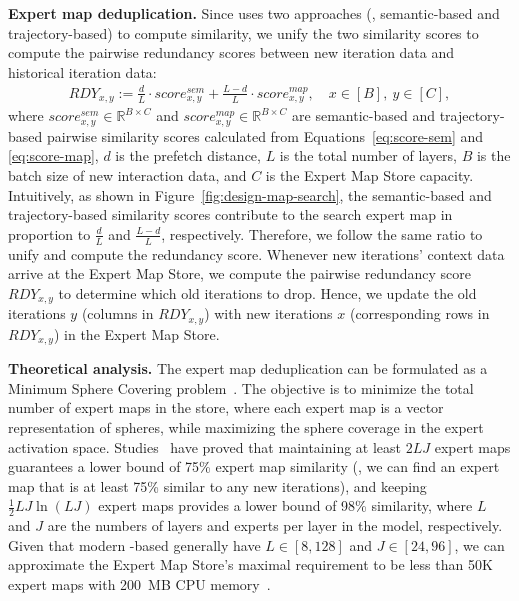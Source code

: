 \textbf{Expert map deduplication.}
Since \sys uses two approaches (\ie, semantic-based and trajectory-based) to compute similarity, we unify the two similarity scores to compute the pairwise redundancy scores between new iteration data and historical iteration data:
\begin{align*}
    \textit{RDY}_{x,y} := \frac{d}{L} \cdot \textit{score}^{\textit{sem}}_{x,y} + \frac{L-d}{L} \cdot \textit{score}^{\textit{map}}_{x,y}, \quad x \in [B], ~y \in [C],
\end{align*}
where $\textit{score}^{\textit{sem}}_{x,y} \in \mathbb{R}^{B \times C}$ and $\textit{score}^{\textit{map}}_{x,y} \in \mathbb{R}^{B \times C}$ are semantic-based and trajectory-based pairwise similarity scores calculated from Equations~\ref{eq:score-sem} and \ref{eq:score-map}, $d$ is the prefetch distance, $L$ is the total number of layers, $B$ is the batch size of new interaction data, and $C$ is the Expert Map Store capacity.
Intuitively, as shown in Figure~\ref{fig:design-map-search}, the semantic-based and trajectory-based similarity scores contribute to the search expert map in proportion to $\frac{d}{L}$ and $\frac{L-d}{L}$, respectively. 
Therefore, we follow the same ratio to unify and compute the redundancy score.
Whenever new iterations' context data arrive at the Expert Map Store, we compute the pairwise redundancy score $\textit{RDY}_{x,y}$ to determine which old iterations to drop.
Hence, we update the old iterations $y$ (columns in $\textit{RDY}_{x,y}$) with new iterations $x$ (corresponding rows in $\textit{RDY}_{x,y}$) in the Expert Map Store.


\textbf{Theoretical analysis.}
The expert map deduplication can be formulated as a Minimum Sphere Covering problem~\cite{elzinga1972minimum}.
The objective is to minimize the total number of expert maps in the store, where each expert map is a vector representation of spheres, while maximizing the sphere coverage in the expert activation space.
Studies~\cite{rankin1947closest,dumer2007covering} have proved that maintaining at least $2LJ$ expert maps guarantees a lower bound of 75\% expert map similarity (\ie, we can find an expert map that is at least 75\% similar to any new iterations), and keeping $\frac{1}{2}LJ \ln(LJ)$ expert maps provides a lower bound of 98\% similarity, where $L$ and $J$ are the numbers of layers and experts per layer in the \MoE model, respectively.
Given that modern \MoE-based \LLMs generally have $L \in [8, 128]$ and $J \in [24, 96]$, we can approximate the Expert Map Store's maximal requirement to be less than 50K expert maps with 200~MB CPU memory~\cite{xue2024moe}.


